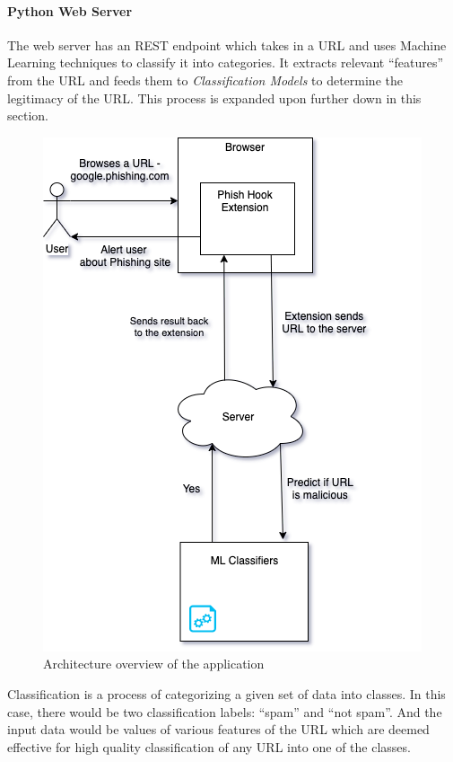 \documentclass[conference]{IEEEtran}
\begin{document}
\paragraph{Python Web Server}
The web server has an REST endpoint which takes in a URL and uses Machine Learning techniques to classify it into categories.
It extracts relevant ``features'' from the URL and feeds them to \emph{Classification Models} to determine the legitimacy of the URL.
This process is expanded upon further down in this section.

\begin{figure}[htbp]
    \centerline{\includegraphics[scale=.5]{phish-arch.png}}
    \caption{Architecture overview of the application}
    \label{fig}
\end{figure}

\par Classification is a process of categorizing a given set of data into classes.
In this case, there would be two classification labels: ``spam'' and ``not spam''.
And the input data would be values of various features of the URL which are deemed effective for high quality classification of any URL into one of the classes.
\end{document}
